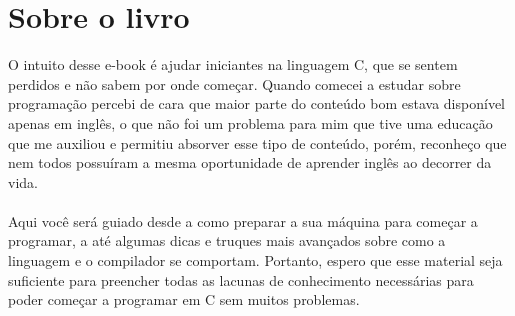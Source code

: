 \section{Sobre o livro}

O intuito desse e-book é ajudar iniciantes na linguagem C, que se 
sentem perdidos e não sabem por onde começar. Quando comecei a estudar sobre 
programação percebi de cara que maior parte do conteúdo bom estava disponível 
apenas em inglês, o que não foi um problema para mim que tive uma educação 
que me auxiliou e permitiu absorver esse tipo de conteúdo, porém, reconheço 
que nem todos possuíram a mesma oportunidade de aprender inglês ao decorrer 
da vida.
\\\\
Aqui você será guiado desde a como preparar a sua máquina para começar 
a programar, a até algumas dicas e truques mais avançados sobre como a linguagem 
e o compilador se comportam. Portanto, espero que esse material seja suficiente 
para preencher todas as lacunas de conhecimento necessárias para poder começar 
a programar em C sem muitos problemas.
